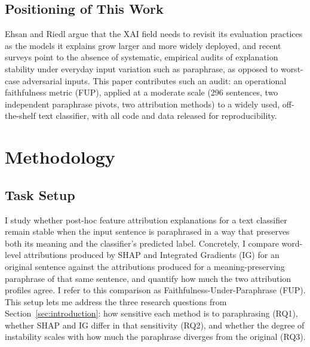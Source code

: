 \subsection{Positioning of This Work}

Ehsan and Riedl \citep{ehsan2024explainable} argue that the XAI field
needs to revisit its evaluation practices as the models it explains grow
larger and more widely deployed, and recent surveys
\citep{lyu2024towards,palikhe2025towards} point to the absence of
systematic, empirical audits of explanation stability under everyday
input variation such as paraphrase, as opposed to worst-case adversarial
inputs. This paper contributes such an audit: an operational
faithfulness metric (FUP), applied at a moderate scale (296 sentences,
two independent paraphrase pivots, two attribution methods) to a widely
used, off-the-shelf text classifier, with all code and data released
for reproducibility.


\section{Methodology}
\label{sec:methodology}

\subsection{Task Setup}

I study whether post-hoc feature attribution explanations for a text
classifier remain stable when the input sentence is paraphrased in a way
that preserves both its meaning and the classifier's predicted label.
Concretely, I compare word-level attributions produced by SHAP
\citep{lundberg2017unified} and Integrated Gradients (IG)
\citep{sundararajan2017axiomatic} for an original sentence against the
attributions produced for a meaning-preserving paraphrase of that same
sentence, and quantify how much the two attribution profiles agree. I
refer to this comparison as Faithfulness-Under-Paraphrase (FUP). This
setup lets me address the three research questions from
Section~\ref{sec:introduction}: how sensitive each method is to
paraphrasing (RQ1), whether SHAP and IG differ in that sensitivity
(RQ2), and whether the degree of instability scales with how much the
paraphrase diverges from the original (RQ3).

